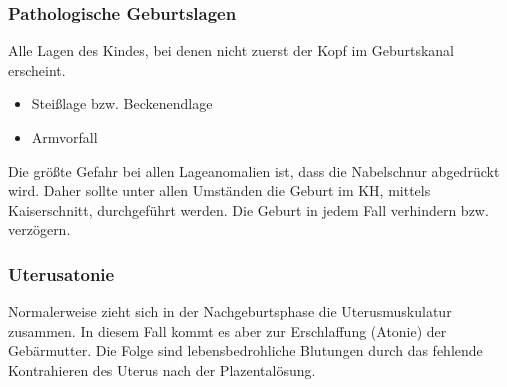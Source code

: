 \subsubsection{Pathologische Geburtslagen}


Alle Lagen des Kindes, bei denen nicht zuerst der Kopf im Geburtskanal erscheint.
\begin{itemize}
	\item Steißlage bzw. Beckenendlage
	\item Armvorfall
\end{itemize}

Die größte Gefahr bei allen Lageanomalien ist, dass die Nabelschnur abgedrückt
wird. Daher sollte unter allen Umständen die Geburt im KH, mittels Kaiserschnitt,
durchgeführt werden. Die Geburt in jedem Fall verhindern bzw. verzögern.


% 
% 
% 
% 
% 
% 
% 
% 
% 

\subsubsection{Uterusatonie}


Normalerweise zieht sich in der Nachgeburtsphase die Uterusmuskulatur zusammen. In diesem Fall kommt es aber zur Erschlaffung (Atonie) der Gebärmutter. Die Folge sind lebensbedrohliche Blutungen durch das fehlende Kontrahieren des Uterus nach der Plazentalösung.


